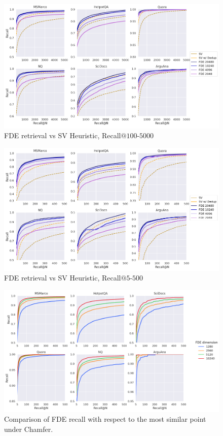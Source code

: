 \newpage
\begin{figure}[t]
    \centering
  \includegraphics[width=\linewidth]{plots/SV_vs_MV_full5k_v2.png}
   \caption{FDE retrieval vs SV Heuristic, Recall$@100$-$5000$}
         \label{fig:sv_mv_full5k} %
\end{figure}

\begin{figure}[t]
    \centering
  \includegraphics[width=\linewidth]{plots/SV_vs_MV_full500_v2.png}
   \caption{FDE retrieval vs SV Heuristic, Recall$@5$-$500$}
         \label{fig:sv_mv_full500} %
\end{figure}



\begin{figure}[h!]
    \centering
  \includegraphics[width=\linewidth]{plots/MV_vs_bruteforce_v2.png}
    \caption{Comparison of FDE recall with respect to the most similar point under Chamfer.}
          \label{fig:mv_vs_bf_full} %
\end{figure}



